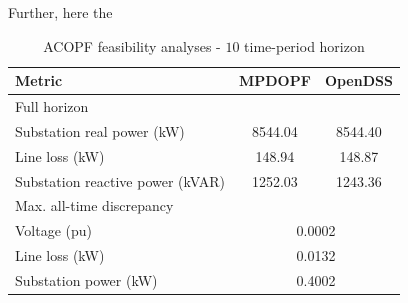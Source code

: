 \documentclass[../../outputs/main.tex]{subfiles}
\begin{document}
Further, here the 

\begin{table}[h!]
    \centering
    \caption{ACOPF feasibility analyses - $10$ time-period horizon}
    \begin{tabular}{|l|c|c|}
    \hline
    \textbf{Metric} & \textbf{MPDOPF} & \textbf{OpenDSS} \\ \hline
    Full horizon  & \multicolumn{2}{c|}{} \\ \hline
    \quad Substation real power (kW) & 8544.04 & 8544.40 \\ \hline
    \quad Line loss (kW) & 148.94 & 148.87 \\ \hline
    \quad Substation reactive power (kVAR) & 1252.03 & 1243.36 \\ \hline
    Max. all-time discrepancy & \multicolumn{2}{c|}{} \\ \hline
    \quad Voltage (pu) & \multicolumn{2}{c|}{0.0002} \\ \hline
    \quad Line loss (kW) & \multicolumn{2}{c|}{0.0132} \\ \hline
    \quad Substation power (kW) & \multicolumn{2}{c|}{0.4002} \\ \hline
    \end{tabular}
    \label{table:feas-copf-10-20-30}
\end{table}

\end{document}
